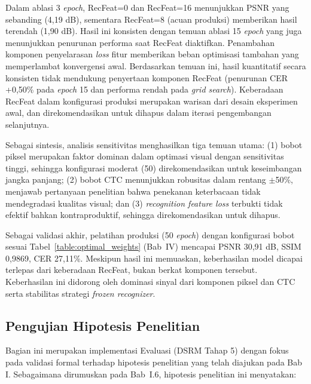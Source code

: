 \documentclass[12pt,a4paper]{article}
\begin{document}
\begin{enumerate}[leftmargin=1.5em, labelsep=0.5em, itemindent=0pt, label=\arabic*., topsep=0pt, partopsep=0pt]
\begin{enumerate}[leftmargin=1.5em, labelsep=0.5em, itemindent=0pt, topsep=0.5em, label=\alph*.]
        Dalam ablasi 3 \textit{epoch}, RecFeat=0 dan RecFeat=16 menunjukkan PSNR yang sebanding (4,19 dB), sementara RecFeat=8 (acuan produksi) memberikan hasil terendah (1,90 dB). Hasil ini konsisten dengan temuan ablasi 15 \textit{epoch} yang juga menunjukkan penurunan performa saat RecFeat diaktifkan. Penambahan komponen penyelarasan \textit{loss} fitur memberikan beban optimisasi tambahan yang memperlambat konvergensi awal. Berdasarkan temuan ini, hasil kuantitatif secara konsisten tidak mendukung penyertaan komponen RecFeat (penurunan CER +0,50\% pada \textit{epoch} 15 dan performa rendah pada \textit{grid search}). Keberadaan RecFeat dalam konfigurasi produksi merupakan warisan dari desain eksperimen awal, dan direkomendasikan untuk dihapus dalam iterasi pengembangan selanjutnya.
    \end{enumerate}
\end{enumerate}

Sebagai sintesis, analisis sensitivitas menghasilkan tiga temuan utama: (1) bobot piksel merupakan faktor dominan dalam optimasi visual dengan sensitivitas tinggi, sehingga konfigurasi moderat (50) direkomendasikan untuk keseimbangan jangka panjang; (2) bobot CTC menunjukkan robusitas dalam rentang $\pm$50\%, menjawab pertanyaan penelitian bahwa penekanan keterbacaan tidak mendegradasi kualitas visual; dan (3) \textit{recognition feature loss} terbukti tidak efektif bahkan kontraproduktif, sehingga direkomendasikan untuk dihapus.

Sebagai validasi akhir, pelatihan produksi (50 \textit{epoch}) dengan konfigurasi bobot sesuai Tabel~\ref{table:optimal_weights} (Bab~IV) mencapai PSNR 30,91 dB, SSIM 0,9869, CER 27,11\%. Meskipun hasil ini memuaskan, keberhasilan model dicapai terlepas dari keberadaan RecFeat, bukan berkat komponen tersebut. Keberhasilan ini didorong oleh dominasi sinyal dari komponen piksel dan CTC serta stabilitas strategi \textit{frozen recognizer}.



\subsection{Pengujian Hipotesis Penelitian}
\label{subsec:pengujian-hipotesis}

Bagian ini merupakan implementasi Evaluasi (DSRM Tahap 5) dengan fokus pada validasi formal terhadap hipotesis penelitian yang telah diajukan pada Bab I. Sebagaimana dirumuskan pada Bab~I.6, hipotesis penelitian ini menyatakan:
\end{document}
